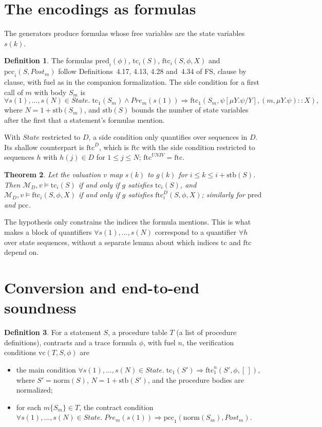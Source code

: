 \documentclass[11pt]{article}
\newcommand{\State}{\mathit{State}}
\newcommand{\Pre}{\mathit{Pre}}
\newcommand{\Post}{\mathit{Post}}
\newcommand{\tc}{\mathrm{tc}}
\newcommand{\ftc}{\mathrm{ftc}}
\newcommand{\pred}{\mathrm{pred}}
\newcommand{\pcc}{\mathrm{pcc}}
\newcommand{\norm}{\mathrm{norm}}
\newcommand{\stb}{\mathrm{stb}}
\newcommand{\vc}{\mathrm{vc}}
\newcommand{\M}{\mathcal{M}}
\newcommand{\Th}[1]{#1 of FS}
\theoremstyle{plain}
\newtheorem{theorem}{Theorem}[section]
\theoremstyle{definition}
\newtheorem{definition}[theorem]{Definition}
\theoremstyle{remark}
\begin{document}
\section{The encodings as formulas}\label{sec:gen}

The generators produce formulas whose free variables are the state
variables $s(k)$.

\begin{definition}\label{def:gen}
  The formulas $\pred_i(\phi)$, $\tc_i(S)$, $\ftc_i(S, \phi, X)$ and
  $\pcc_i(S, \Post_m)$ follow \Th{Definitions~4.17, 4.13, 4.28 and~4.34},
  clause by clause, with fuel as in the companion formalization. The side
  condition for a first call of $m$ with body $S_m$ is
  \[
    \forall s(1), \dots, s(N) \in \State.\;
      \tc_1(S_m) \land \Pre_m(s(1)) \Rightarrow
      \ftc_1(S_m, \psi[\mu Y.\psi/Y], (m, \mu Y.\psi) :: X),
  \]
  where $N = 1 + \stb(S_m)$, and $\stb(S)$ bounds the number of state
  variables after the first that a statement's formulas mention.
\end{definition}

With $\State$ restricted to $D$, a side condition only quantifies over
sequences in $D$. Its shallow counterpart is $\ftc^D$, which is $\ftc$
with the side condition restricted to sequences $h$ with $h(j) \in D$ for
$1 \le j \le N$; $\ftc^{\mathit{UNIV}} = \ftc$.

\begin{theorem}\label{thm:gen}
  Let the valuation $v$ map $s(k)$ to $g(k)$ for $i \le k \le i + \stb(S)$.
  Then $\M_D, v \models \tc_i(S)$ if and only if $g$ satisfies
  $\tc_i(S)$, and $\M_D, v \models \ftc_i(S, \phi, X)$ if and only if
  $g$ satisfies $\ftc^D_i(S, \phi, X)$; similarly for $\pred$ and $\pcc$.
\end{theorem}

The hypothesis only constrains the indices the formula mentions. This is
what makes a block of quantifiers $\forall s(1), \dots, s(N)$ correspond to
a quantifier $\forall h$ over state sequences, without a separate lemma
about which indices $\tc$ and $\ftc$ depend on.

\section{Conversion and end-to-end soundness}\label{sec:e2e}

\begin{definition}\label{def:vc}
  For a statement $S$, a procedure table $T$ (a list of procedure
  definitions), contracts and a trace formula $\phi$, with fuel $n$, the
  verification conditions $\vc(T, S, \phi)$ are
  \begin{itemize}
  \item the main condition
    $\forall s(1), \dots, s(N) \in \State.\; \tc_1(S') \Rightarrow
    \ftc^n_1(S', \phi, [\,])$, where $S' = \norm(S)$, $N = 1 + \stb(S')$,
    and the procedure bodies are normalized;
  \item for each $m\{S_m\} \in T$, the contract condition
    $\forall s(1), \dots, s(N) \in \State.\; \Pre_m(s(1)) \Rightarrow
    \pcc_1(\norm(S_m), \Post_m)$.
  \end{itemize}
\end{definition}
\end{document}

